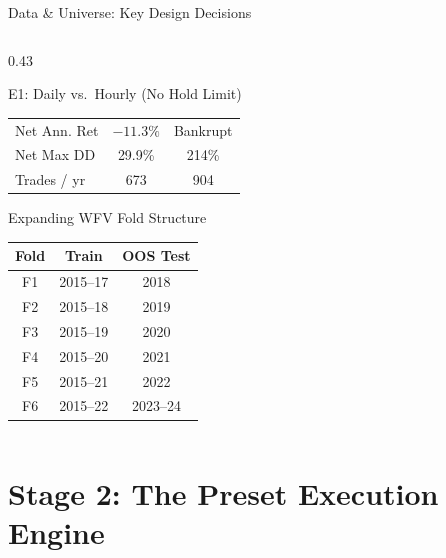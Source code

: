 \documentclass[aspectratio=169,10pt]{beamer}
\begin{document}
\begin{frame}{Data \& Universe: Key Design Decisions}
\begin{columns}[T]
\begin{column}{0.43\textwidth}
\begin{block}{E1: Daily vs.\ Hourly (No Hold Limit)}
\begin{tabular}{lcc}
          Net Ann. Ret   & $-11.3\%$ & \alert{Bankrupt} \\
          Net Max DD     & 29.9\% & 214\% \\
          Trades / yr    & 673   & 904 \\
          \bottomrule
        \end{tabular}
      \end{block}
      \vspace{4pt}
      \begin{block}{Expanding WFV Fold Structure}
        \centering\scriptsize
        \renewcommand{\arraystretch}{1.2}
        \begin{tabular}{ccc}
          \toprule
          \textbf{Fold} & \textbf{Train} & \textbf{OOS Test} \\
          \midrule
          F1 & 2015--17 & 2018 \\
          F2 & 2015--18 & 2019 \\
          F3 & 2015--19 & 2020 \\
          F4 & 2015--20 & 2021 \\
          F5 & 2015--21 & 2022 \\
          F6 & 2015--22 & 2023--24 \\
          \bottomrule
        \end{tabular}
      \end{block}
    \end{column}
  \end{columns}
\end{frame}

\section{Stage 2: The Preset Execution Engine}
\end{document}
